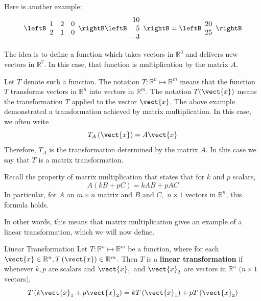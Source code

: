 \begin{solution}
Here is another example:
\begin{equation*}
\leftB
\begin{array}{rrr}
1 & 2 & 0 \\
2 & 1 & 0
\end{array}
\rightB \leftB
\begin{array}{r}
10 \\
5 \\
-3
\end{array}
\rightB =\allowbreak \leftB
\begin{array}{r}
20 \\
25
\end{array}
\rightB
\end{equation*}
\end{solution}

The idea is to define a function which takes vectors in
$\mathbb{R}^{3}$ and delivers new vectors in $\mathbb{R}^{2}.$ In this
case, that function is multiplication by the matrix $A$.

Let $T$ denote such a function. The notation $T:\mathbb{R}^{n}\mapsto \mathbb{R}^{m}$ means that the function $T$
transforms vectors in $\mathbb{R}^{n}$ into vectors in $\mathbb{R}^{m}$. The notation $T(\vect{x})$ means the transformation $T$ applied to the vector $\vect{x}$. The above example demonstrated a transformation achieved by matrix multiplication. In this case,  we often write
\begin{equation*}
T_{A}\left( \vect{x}\right) =A \vect{x}
\end{equation*}
Therefore, $T_{A}$ is the transformation determined by the matrix $A$. In this case we say that $T$ is a matrix transformation. 

Recall the property of matrix multiplication that states that for 
$k $ and $p$ scalars,
\begin{equation*}
A\left( kB+pC\right) =kAB+pAC
\end{equation*}
In particular, for $A$ an $m\times n$ matrix and $B$ and $C,$ $n\times 1$
vectors in $\mathbb{R}^{n}$,  this formula holds.

In other words, this means that matrix multiplication gives an
example of a linear transformation, which we will now define. 

\begin{definition}{Linear Transformation}\label{def:lineartransformation}
 Let $T:\mathbb{R}^{n}\mapsto \mathbb{R}^{m}$ be a function, where for each
$\vect{x} \in \mathbb{R}^{n},T\left(\vect{x}\right)\in \mathbb{R}^{m}.$ Then $T$ is a
 \textbf{linear transformation}
if whenever $k ,p $ are scalars and 
$\vect{x}_1$ and $\vect{x}_2$ are vectors in $\mathbb{R}^{n}$ $(
n\times 1$ vectors$),$
\begin{equation*}
T\left( k \vect{x}_1 + p \vect{x}_2 \right) = kT\left(\vect{x}_1\right)+ pT\left(\vect{x}_{2} \right)
\end{equation*}
\end{definition}

